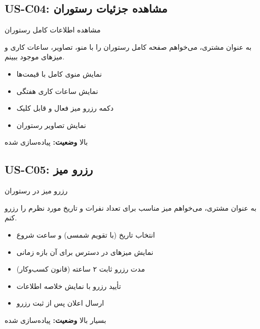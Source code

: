 \documentclass[12pt, a4paper]{article}
\begin{document}
\subsection{US-C04: مشاهده جزئیات رستوران}
\begin{description}[rightmargin=0.5cm]
  \item[عنوان:] مشاهده اطلاعات کامل رستوران
  \item[داستان:] به عنوان مشتری، می‌خواهم صفحه کامل رستوران را با منو، تصاویر، ساعات
  کاری و میزهای موجود ببینم.
  \item[معیارهای پذیرش:]
  \begin{itemize}[rightmargin=0.5cm]
    \item نمایش منوی کامل با قیمت‌ها
    \item نمایش ساعات کاری هفتگی
    \item دکمه رزرو میز فعال و قابل کلیک
    \item نمایش تصاویر رستوران
  \end{itemize}
  \item[اولویت:] بالا \quad \textbf{وضعیت:} پیاده‌سازی شده
\end{description}

\subsection{US-C05: رزرو میز}
\begin{description}[rightmargin=0.5cm]
  \item[عنوان:] رزرو میز در رستوران
  \item[داستان:] به عنوان مشتری، می‌خواهم میز مناسب برای تعداد نفرات و تاریخ مورد نظرم
  را رزرو کنم.
  \item[معیارهای پذیرش:]
  \begin{itemize}[rightmargin=0.5cm]
    \item انتخاب تاریخ (با تقویم شمسی) و ساعت شروع
    \item نمایش میزهای در دسترس برای آن بازه زمانی
    \item مدت رزرو ثابت ۲ ساعته (قانون کسب‌وکار)
    \item تأیید رزرو با نمایش خلاصه اطلاعات
    \item ارسال اعلان پس از ثبت رزرو
  \end{itemize}
  \item[اولویت:] بسیار بالا \quad \textbf{وضعیت:} پیاده‌سازی شده
\end{description}
\end{document}
